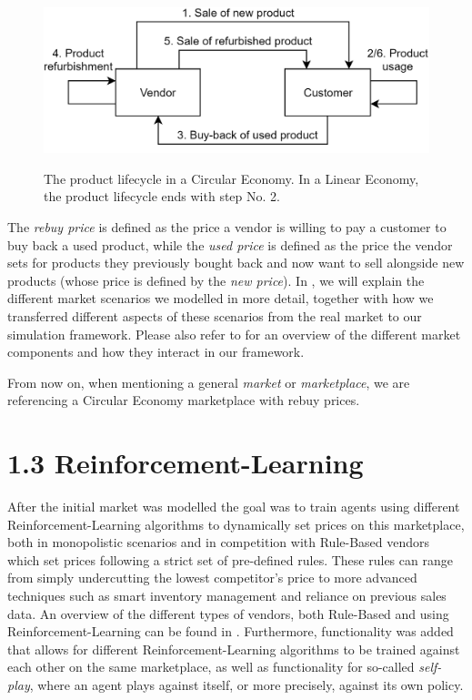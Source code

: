 \begin{figure}[t]
	\centering
	\includegraphics[width = \textwidth]{images/product_lifecycle.png}\\
	\caption{The product lifecycle in a Circular Economy. In a Linear Economy, the product lifecycle ends with step No. 2.}\label{fig:IntroMarketDynamics}
\end{figure}

The \emph{rebuy price} is defined as the price a vendor is willing to pay a customer to buy back a used product, while the \emph{used price} is defined as the price the vendor sets for products they previously bought back and now want to sell alongside new products (whose price is defined by the \emph{new price}). In , we will explain the different market scenarios we modelled in more detail, together with how we transferred different aspects of these scenarios from the real market to our simulation framework. Please also refer to  for an overview of the different market components and how they interact in our framework.

From now on, when mentioning a general \emph{market} or \emph{marketplace}, we are referencing a Circular Economy marketplace with rebuy prices.

\section*{1.3 Reinforcement-Learning}\label{sec:ReinforcementLearningIntroduction}

After the initial market was modelled the goal was to train agents using different Reinforcement-Learning algorithms to dynamically set prices on this marketplace, both in monopolistic scenarios and in competition with Rule-Based vendors which set prices following a strict set of pre-defined rules. These rules can range from simply undercutting the lowest competitor's price to more advanced techniques such as smart inventory management and reliance on previous sales data. An overview of the different types of vendors, both Rule-Based and using Reinforcement-Learning can be found in . Furthermore, functionality was added that allows for different Reinforcement-Learning algorithms to be trained against each other on the same marketplace, as well as functionality for so-called \emph{self-play}, where an agent plays against itself, or more precisely, against its own policy.

